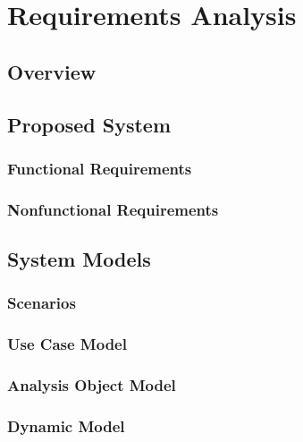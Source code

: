 \chapter{Requirements Analysis}

\section{Overview}

\section{Proposed System}
\subsection{Functional Requirements}
\subsection{Nonfunctional Requirements}

\section{System Models}
\subsection{Scenarios}
\subsection{Use Case Model}
\subsection{Analysis Object Model}
\subsection{Dynamic Model}
